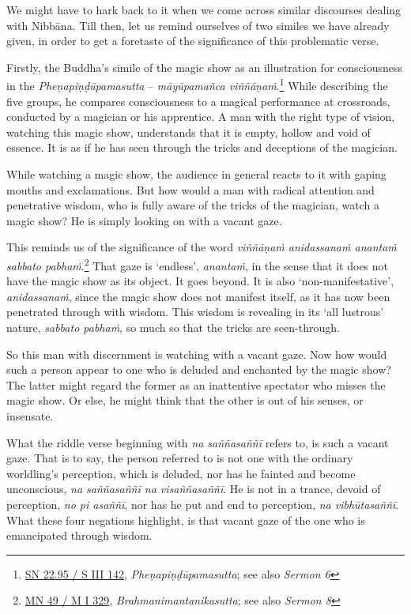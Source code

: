 We might have to hark back to it when we come across similar discourses dealing with Nibbāna. Till then, let us remind ourselves of two similes we have already given, in order to get a foretaste of the significance of this problematic verse.

\enlargethispage{\baselineskip}

Firstly, the Buddha's simile of the magic show as an illustration for consciousness in the \emph{Pheṇapiṇḍūpamasutta} -- \emph{māyūpamañca viññāṇaṁ}.\footnote{\href{https://suttacentral.net/sn22.95/pli/ms}{SN 22.95 / S III 142}, \emph{Pheṇapiṇḍūpamasutta}; see also \emph{Sermon 6}} While describing the five groups, he compares consciousness to a magical performance at crossroads, conducted by a magician or his apprentice. A man with the right type of vision, watching this magic show, understands that it is empty, hollow and void of essence. It is as if he has seen through the tricks and deceptions of the magician.

While watching a magic show, the audience in general reacts to it with gaping mouths and exclamations. But how would a man with radical attention and penetrative wisdom, who is fully aware of the tricks of the magician, watch a magic show? He is simply looking on with a vacant gaze.

This reminds us of the significance of the word \emph{viññāṇaṁ anidassanaṁ anantaṁ sabbato pabhaṁ}.\footnote{\href{https://suttacentral.net/mn49/pli/ms}{MN 49 / M I 329}, \emph{Brahmanimantanikasutta}; see also \emph{Sermon 8}} That gaze is `endless', \emph{anantaṁ}, in the sense that it does not have the magic show as its object. It goes beyond. It is also `non-manifestative', \emph{anidassanaṁ}, since the magic show does not manifest itself, as it has now been penetrated through with wisdom. This wisdom is revealing in its `all lustrous' nature, \emph{sabbato pabhaṁ}, so much so that the tricks are seen-through.

So this man with discernment is watching with a vacant gaze. Now how would such a person appear to one who is deluded and enchanted by the magic show? The latter might regard the former as an inattentive spectator who misses the magic show. Or else, he might think that the other is out of his senses, or insensate.

What the riddle verse beginning with \emph{na saññasaññī} refers to, is such a vacant gaze. That is to say, the person referred to is not one with the ordinary worldling's perception, which is deluded, nor has he fainted and become unconscious, \emph{na saññasaññī na visaññasaññī}. He is not in a trance, devoid of perception, \emph{no pi asaññī}, nor has he put and end to perception, \emph{na vibhūtasaññī}. What these four negations highlight, is that vacant gaze of the one who is emancipated through wisdom.

